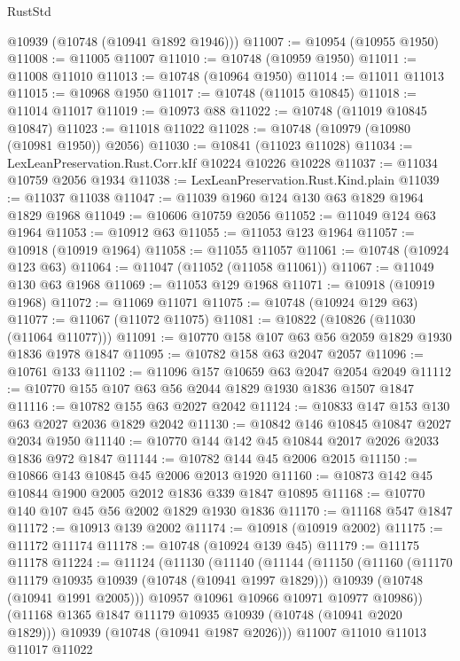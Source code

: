 \begin{lexlean}{RustStd}
\begin{coremodule}
{\begin{coremodule}
{{{{{      @10939
      (@10748 (@10941 @1892 @1946)))
@11007 := @10954 (@10955 @1950)
@11008 := @11005 @11007
@11010 := @10748 (@10959 @1950)
@11011 := @11008 @11010
@11013 := @10748 (@10964 @1950)
@11014 := @11011 @11013
@11015 := @10968 @1950
@11017 := @10748 (@11015 @10845)
@11018 := @11014 @11017
@11019 := @10973 @88
@11022 := @10748 (@11019 @10845 @10847)
@11023 := @11018 @11022
@11028 := @10748 (@10979 (@10980 (@10981 @1950)) @2056)
@11030 := @10841 (@11023 @11028)
@11034 := LexLeanPreservation.Rust.Corr.kIf @10224 @10226 @10228
@11037 := @11034 @10759 @2056 @1934
@11038 := LexLeanPreservation.Rust.Kind.plain
@11039 := @11037 @11038
@11047 := @11039 @1960 @124 @130 @63 @1829 @1964 @1829 @1968
@11049 := @10606 @10759 @2056
@11052 := @11049 @124 @63 @1964
@11053 := @10912 @63
@11055 := @11053 @123 @1964
@11057 := @10918 (@10919 @1964)
@11058 := @11055 @11057
@11061 := @10748 (@10924 @123 @63)
@11064 := @11047 (@11052 (@11058 @11061))
@11067 := @11049 @130 @63 @1968
@11069 := @11053 @129 @1968
@11071 := @10918 (@10919 @1968)
@11072 := @11069 @11071
@11075 := @10748 (@10924 @129 @63)
@11077 := @11067 (@11072 @11075)
@11081 := @10822 (@10826 (@11030 (@11064 @11077)))
@11091 := @10770 @158 @107 @63 @56 @2059 @1829 @1930 @1836 @1978 @1847
@11095 := @10782 @158 @63 @2047 @2057
@11096 := @10761 @133
@11102 := @11096 @157 @10659 @63 @2047 @2054 @2049
@11112 := @10770 @155 @107 @63 @56 @2044 @1829 @1930 @1836 @1507 @1847
@11116 := @10782 @155 @63 @2027 @2042
@11124 := @10833 @147 @153 @130 @63 @2027 @2036 @1829 @2042
@11130 := @10842 @146 @10845 @10847 @2027 @2034 @1950
@11140 := @10770 @144 @142 @45 @10844 @2017 @2026 @2033 @1836 @972 @1847
@11144 := @10782 @144 @45 @2006 @2015
@11150 := @10866 @143 @10845 @45 @2006 @2013 @1920
@11160 := @10873 @142 @45 @10844 @1900 @2005 @2012 @1836 @339 @1847 @10895
@11168 := @10770 @140 @107 @45 @56 @2002 @1829 @1930 @1836
@11170 := @11168 @547 @1847
@11172 := @10913 @139 @2002
@11174 := @10918 (@10919 @2002)
@11175 := @11172 @11174
@11178 := @10748 (@10924 @139 @45)
@11179 := @11175 @11178
@11224 := @11124
    (@11130
      (@11140
        (@11144
          (@11150
            (@11160
              (@11170 @11179 @10935 @10939 (@10748 (@10941 @1997 @1829)))
              @10939
              (@10748 (@10941 @1991 @2005)))
            @10957
            @10961
            @10966
            @10971
            @10977
            @10986))
        (@11168 @1365 @1847 @11179 @10935 @10939 (@10748 (@10941 @2020 @1829)))
        @10939
        (@10748 (@10941 @1987 @2026)))
      @11007
      @11010
      @11013
      @11017
      @11022
}}}}}
\end{coremodule}}
\end{coremodule}
\end{lexlean}
